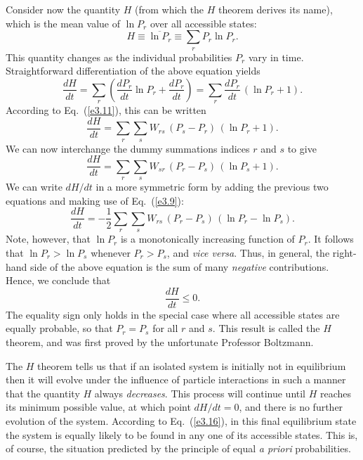 Consider now the quantity $H$ (from which the $H$ theorem derives its name),
which is the mean value of $\ln P_r$ over all accessible states:
\begin{equation}
H\equiv \overline{\ln P_r} \equiv \sum_r P_r \ln P_r.
\end{equation}
This quantity changes as the individual probabilities $P_r$ 
vary in time. Straightforward differentiation of the above equation
yields
\begin{equation}
\frac{dH}{dt} = \sum_r \left(\frac{d P_r}{dt} \ln P_r +\frac{d P_r}
{dt}\right) = \sum_r \frac{d P_r}{dt}\,(\ln P_r + 1).
\end{equation}
According to Eq.~(\ref{e3.11}), this can be written
\begin{equation}
\frac{d H}{dt} = \sum_r\sum_s W_{rs}\, (P_s-P_r)\,(\ln P_r +1).
\end{equation}
We can now interchange the dummy summations indices $r$ and $s$ to give
\begin{equation}
\frac{d H}{dt} = \sum_r\sum_s W_{sr}\,  (P_r-P_s)\,(\ln P_s +1).
\end{equation}
We can write  $d H/dt$  in a more symmetric
form by adding  the previous two equations and making use of Eq.~(\ref{e3.9}):
\begin{equation}
\frac{d H}{dt}= -\frac{1}{2}\sum_r \sum_s W_{rs}\,(P_r-P_s)\,(\ln P_r
-\ln P_s).\label{e3.16}
\end{equation}
Note, however, that $\ln P_r$ is a monotonically increasing function of
$P_r$. It follows that $\ln P_r > \ln P_s$ whenever $P_r > P_s$, and {\em
vice versa}. Thus, in general, the right-hand side of the above equation is 
the sum of many  {\em negative}\/ contributions. Hence, we conclude that
\begin{equation}
\frac{d H}{dt} \leq 0.
\end{equation}
The equality sign only holds in the special case where all accessible states are
equally probable, so that $P_r=P_s$ for all $r$ and $s$. This result is 
called the
$H$ theorem, and was first proved by the unfortunate Professor Boltzmann.

The $H$ theorem tells us that if an isolated system is initially not in
equilibrium then it will evolve under the influence of particle interactions in
such a manner that the quantity $H$ always {\em decreases}. This process will 
continue until $H$ reaches its minimum possible value, at which point
$d H/dt=0$, and there is no further evolution of the
system. According to Eq.~(\ref{e3.16}), in this final equilibrium state 
the system is equally likely to be found in any one of its accessible 
states. This is, of course, the situation predicted by  the principle
of equal {\em a priori}\/ probabilities.


